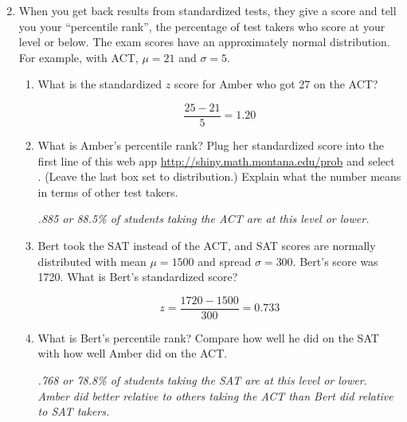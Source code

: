 \begin{enumerate}
\setcounter{enumi}{1}
  \item  When you get back results from standardized tests, they give
    a score and tell you your ``percentile rank'', the percentage
    of test takers who score at your level or below.  The exam scores have
    an approximately normal distribution.  For example, with ACT, $\mu
    = 21$ and $\sigma = 5$.
    \begin{enumerate}
    \item What is the standardized $z$ score for Amber who got 27 on the ACT?
\begin{students}
        \vspace{2cm}        
\end{students}
\begin{key}
  $$ \frac{25 - 21}{5} = 1.20$$
\end{key}
    \item What is Amber's percentile rank?  Plug her standardized score into the
      first line of this web app 
      \url{http://shiny.math.montana.edu/prob} and select
      . (Leave the last box set to 
      distribution.) Explain what the number means in terms of other
      test takers.  
\begin{students}
        \vspace{1cm}        
\end{students}

\begin{key}
 {\it .885 or 88.5\% of students taking the ACT are at this level or lower.}
\end{key}
   \item Bert took the SAT instead of the ACT, and
      SAT scores are normally distributed with mean $\mu = 1500$
     and spread $\sigma = 300$. Bert's score was  1720. What is Bert's
     standardized score?
\begin{students}
        \vspace{2cm}        
\end{students}
\begin{key}
  $$ z = \frac{1720 - 1500}{300} = 0.733$$
\end{key}
    \item What is Bert's percentile rank? Compare how well he did on
      the SAT with how well Amber did on the ACT. 
\begin{students}
        \vspace{2cm}        
\end{students}

\begin{key}
 {\it .768 or 78.8\% of students taking the SAT are at this level
    or lower.  Amber did better relative to others taking the ACT than
    Bert did relative to SAT takers.}
\end{key} 
  \end{enumerate}
\end{enumerate}

